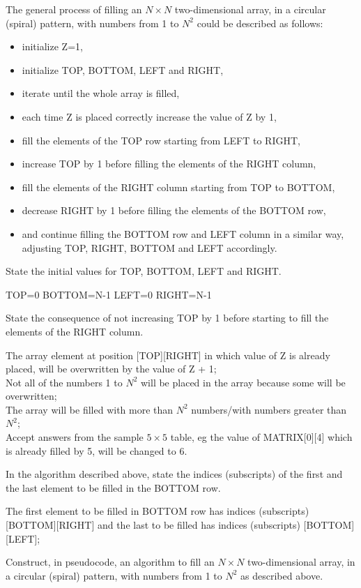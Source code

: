 \begin{exercise*}
The general process of filling an $N \times N$ two-dimensional array, in a circular (spiral) pattern, with numbers from 1 to $N^2$ could be described as follows:

\begin{itemize}
\item initialize Z=1,
\item initialize TOP, BOTTOM, LEFT and RIGHT,
\item iterate until the whole array is filled,
\item each time Z is placed correctly increase the value of Z by 1,
\item fill the elements of the TOP row starting from LEFT to RIGHT,
\item increase TOP by 1 before filling the elements of the RIGHT column,
\item fill the elements of the RIGHT column starting from TOP to BOTTOM,
\item decrease RIGHT by 1 before filling the elements of the BOTTOM row,
\item and continue filling the BOTTOM row and LEFT column in a similar way, adjusting TOP, RIGHT, BOTTOM and LEFT accordingly.
\end{itemize}

\begin{parts}
\item State the initial values for TOP, BOTTOM, LEFT and RIGHT.
	\begin{solution}
	TOP=0
	BOTTOM=N-1
	LEFT=0
	RIGHT=N-1
	\end{solution}
\item State the consequence of not increasing TOP by 1 before starting to fill the elements of the RIGHT column.
	\begin{solution}
	\newline
	The array element at position [TOP][RIGHT] in which value of Z is already placed, will be overwritten by the value of Z + 1;\\
	Not all of the numbers 1 to $N^2$ will be placed in the array because some will be overwritten;\\
	The array will be filled with more than $N^2$ numbers/with numbers greater than $N^2$;\\
	Accept answers from the sample $5 \times 5$ table, eg the value of MATRIX[0][4] which is already filled by 5, will be changed to 6.
	\end{solution}
\item In the algorithm described above, state the indices (subscripts) of the first and the last element to be filled in the BOTTOM row.
	\begin{solution}
	The first element to be filled in BOTTOM row has indices (subscripts) [BOTTOM][RIGHT] and the last to be filled has indices (subscripts) [BOTTOM][LEFT];
	\end{solution}
\item Construct, in pseudocode, an algorithm to fill an $N \times N$ two-dimensional array, in a circular (spiral) pattern, with numbers from 1 to $N^2$ as described above.

\end{parts}
\end{exercise*}